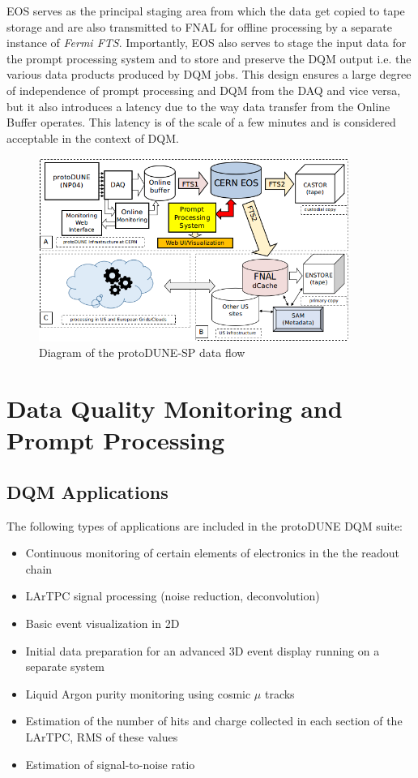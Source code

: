 \documentclass{webofc}
\newcommand{\pd}{protoDUNE\xspace}
\begin{document}
EOS serves as the principal staging area from which the data get copied to tape storage and
are also transmitted to FNAL for offline processing by a separate instance of \textit{Fermi FTS}.
Importantly, EOS also serves to stage the input data for the prompt processing system and to
store and preserve the DQM output i.e. the various data products produced by DQM jobs. This design
ensures a large degree of independence of prompt processing and DQM from the DAQ and vice versa,
but it also introduces a latency due to the way data transfer from the Online Buffer operates. This latency
is of the scale of a few minutes and is considered acceptable in the context of DQM.

\begin{figure}[tb]
\centering\includegraphics[width=0.9\textwidth]{figures/protoDUNE_data_flow_2018_v1.png}
\caption{\label{fig:dataflow}Diagram of the protoDUNE-SP data flow}
\end{figure}


\section{Data Quality Monitoring and Prompt Processing}
\subsection{DQM Applications}
The following types of applications are included in the \pd DQM suite:
\begin{itemize}
\item Continuous monitoring of certain elements of electronics in the the readout chain
\item LArTPC signal processing (noise reduction, deconvolution)
\item Basic event visualization in 2D
\item Initial data preparation for an advanced 3D event display running on a separate system
\item Liquid Argon purity monitoring using cosmic $\mu$ tracks
\item Estimation of the number of hits and charge collected in each section of the LArTPC, RMS of these values
\item Estimation of signal-to-noise ratio
\end{itemize}
\end{document}
